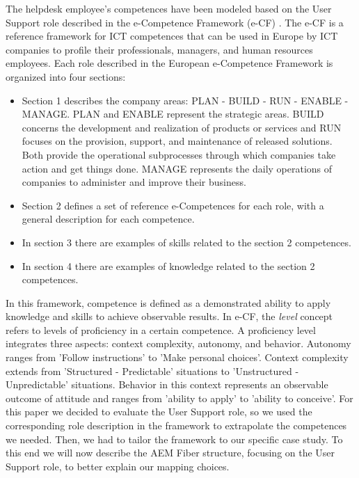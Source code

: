 The helpdesk employee's competences have been modeled based on the User Support role described in the e-Competence Framework (e-CF) \cite{ecompetenceframework}.
The e-CF is a reference framework for ICT competences that can be used in Europe by ICT companies to profile their professionals, managers, and human resources employees.\label{sec:ecompetence-framework}
Each role described in the European e-Competence Framework is organized into four sections:
\begin{itemize}
      \item Section 1 describes the company areas: PLAN - BUILD - RUN - ENABLE - MANAGE. PLAN and ENABLE represent the strategic areas. BUILD concerns the development and realization of products or services and RUN focuses on the provision, support, and maintenance of released solutions. Both provide the operational subprocesses through which companies take action and get things done. MANAGE represents the daily operations of companies to administer and improve their business.
      \item Section 2 defines a set of reference e-Competences for each role, with a general description for each competence.
      \item In section 3 there are examples of skills related to the section 2 competences.
      \item In section 4 there are examples of knowledge related to the section 2 competences.
\end{itemize}
In this framework, competence is defined as a demonstrated ability to apply knowledge and skills to achieve observable results.
In e-CF, the \textit{level} concept refers to levels of proficiency in a certain competence. A proficiency level integrates three aspects: context complexity, autonomy, and behavior. Autonomy ranges from 'Follow instructions' to 'Make personal choices'. Context complexity extends from 'Structured - Predictable' situations to 'Unstructured - Unpredictable' situations. Behavior in this context represents an observable outcome of attitude and ranges from 'ability to apply' to 'ability to conceive'.
For this paper we decided to evaluate the User Support role, so we used the corresponding role description in the framework to extrapolate the competences we needed.
Then, we had to tailor the framework to our specific case study. To this end we will now describe the AEM Fiber structure, focusing on the User Support role, to better explain our mapping choices.

